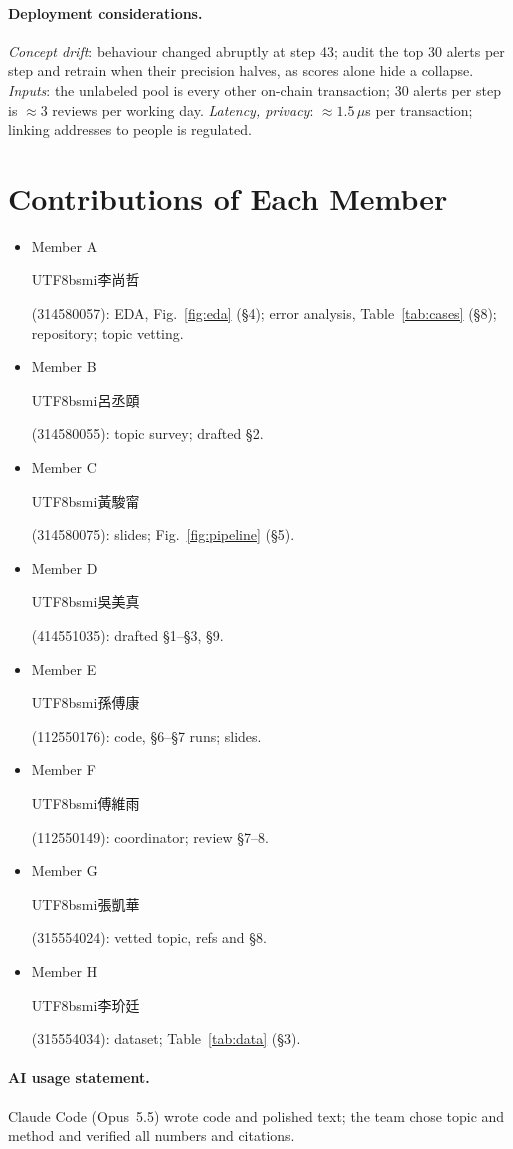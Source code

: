\documentclass[11pt]{article}
\newcommand{\zh}[1]{\begin{CJK}{UTF8}{bsmi}#1\end{CJK}}
\newcommand{\member}[3]{\ifdefined\anonymous Member #1\else\zh{#2} (#3)\fi}
\begin{document}
\paragraph{Deployment considerations.}
\emph{Concept drift}: behaviour changed abruptly at step 43; audit the top 30 alerts per step and retrain when their precision halves, as scores alone hide a collapse.
\emph{Inputs}: the unlabeled pool is every other on-chain transaction; 30 alerts per step is ${\approx}$3 reviews per working day.
\emph{Latency, privacy}: ${\approx}1.5\,\mu$s per transaction; linking addresses to people is regulated.

\section*{Contributions of Each Member}

{\raggedright{}
\begin{itemize}[leftmargin=*,itemsep=0pt,parsep=0pt,topsep=2pt]
\item \member{A}{李尚哲}{314580057}: EDA, Fig.~\ref{fig:eda} (\S4); error analysis, Table~\ref{tab:cases} (\S8); repository; topic vetting.
\item \member{B}{呂丞頤}{314580055}: topic survey; drafted \S2.
\item \member{C}{黃駿甯}{314580075}: slides; Fig.~\ref{fig:pipeline} (\S5).
\item \member{D}{吳美真}{414551035}: drafted \S1--\S3, \S9.
\item \member{E}{孫傅康}{112550176}: code, \S6--\S7 runs; slides.
\item \member{F}{傅維雨}{112550149}: coordinator; review \S7--8.
\item \member{G}{張凱華}{315554024}: vetted topic, refs and \S8.
\item \member{H}{李玠廷}{315554034}: dataset; Table~\ref{tab:data} (\S3).
\end{itemize}
}

\paragraph{AI usage statement.}
Claude Code (Opus~5.5) wrote code and polished text; the team chose topic and method and verified all numbers and citations.


\end{document}
